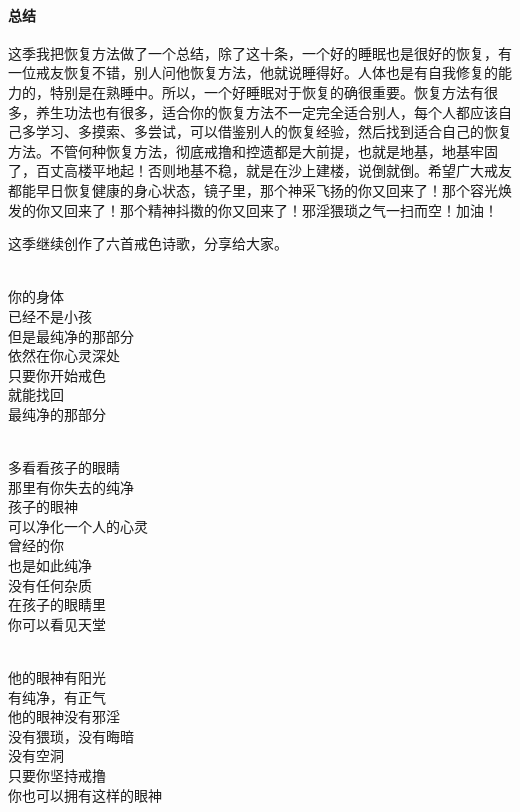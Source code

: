 \paragraph*{总结}

这季我把恢复方法做了一个总结，除了这十条，一个好的睡眠也是很好的恢复，有一位戒友恢复不错，别人问他恢复方法，他就说睡得好。人体也是有自我修复的能力的，特别是在熟睡中。所以，一个好睡眠对于恢复的确很重要。恢复方法有很多，养生功法也有很多，适合你的恢复方法不一定完全适合别人，每个人都应该自己多学习、多摸索、多尝试，可以借鉴别人的恢复经验，然后找到适合自己的恢复方法。不管何种恢复方法，彻底戒撸和控遗都是大前提，也就是地基，地基牢固了，百丈高楼平地起！否则地基不稳，就是在沙上建楼，说倒就倒。希望广大戒友都能早日恢复健康的身心状态，镜子里，那个神采飞扬的你又回来了！那个容光焕发的你又回来了！那个精神抖擞的你又回来了！邪淫猥琐之气一扫而空！加油！

这季继续创作了六首戒色诗歌，分享给大家。

\begin{poem}[最纯净的那部分]
    \begin{multicols}{3}
        \centering~\\
        你的身体 \\ 已经不是小孩 \\ 但是最纯净的那部分 \\ 依然在你心灵深处 \\ 只要你开始戒色 \\ 就能找回 \\ 最纯净的那部分
    \end{multicols}
\end{poem}

\begin{poem}[孩瞳]
    \begin{multicols}{4}
        \centering~\\
        多看看孩子的眼睛 \\ 那里有你失去的纯净 \\ 孩子的眼神 \\ 可以净化一个人的心灵 \\ 曾经的你 \\ 也是如此纯净 \\ 没有任何杂质 \\ 在孩子的眼睛里 \\ 你可以看见天堂
    \end{multicols}
\end{poem}

\begin{poem}[不一样的眼神]
    \begin{multicols}{3}
        \centering~\\
        他的眼神有阳光 \\ 有纯净，有正气 \\ 他的眼神没有邪淫 \\ 没有猥琐，没有晦暗 \\ 没有空洞 \\ 只要你坚持戒撸 \\ 你也可以拥有这样的眼神
    \end{multicols}
\end{poem}

